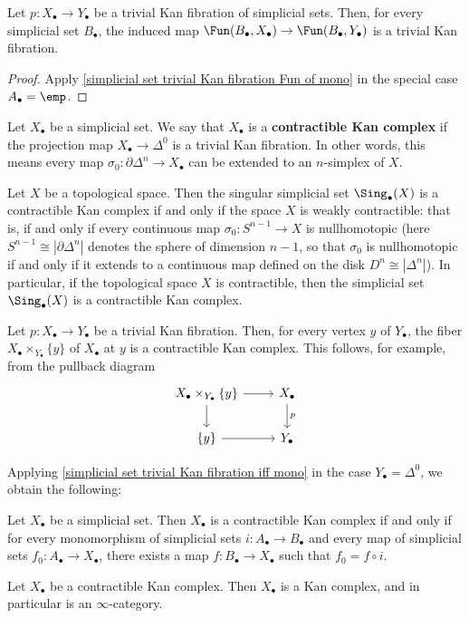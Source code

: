 \begin{corollary}\label{simplicial set Fun(B -) of trivial Kan fibration is fibration}
Let $p:X_\bullet\to Y_\bullet$ be a trivial Kan fibration of simplicial sets. Then, for every simplicial set $B_\bullet$, the induced map $\Fun(B_\bullet,X_\bullet)\to\Fun(B_\bullet,Y_\bullet)$ is a trivial Kan fibration.
\end{corollary}
\begin{proof}
Apply \ref{simplicial set trivial Kan fibration Fun of mono} in the special case $A_\bullet=\emp$.
\end{proof}
Let $X_\bullet$ be a simplicial set. We say that $X_\bullet$ is a \textbf{contractible Kan complex} if the projection map $X_\bullet\to\Delta^0$ is a trivial Kan fibration. In other words, this means every map $\sigma_0:\partial\Delta^n\to X_\bullet$ can be extended to an $n$-simplex of $X$.
\begin{example}
Let $X$ be a topological space. Then the singular simplicial set  $\Sing_\bullet(X)$ is a contractible Kan complex if and only if the space $X$ is weakly contractible: that is, if and only if every continuous map $\sigma_0:S^{n-1}\to X$ is nullhomotopic (here $S^{n-1}\cong|\partial\Delta^n|$ denotes the sphere of dimension $n-1$, so that $\sigma_0$ is nullhomotopic if and only if it extends to a continuous map defined on the disk $D^n\cong|\Delta^n|$). In particular, if the topological space $X$ is contractible, then the simplicial set $\Sing_\bullet(X)$ is a contractible Kan complex.
\end{example}
\begin{remark}\label{simplicial set trivial Kan fibarion fiberwise contractible}
Let $p:X_\bullet\to Y_\bullet$ be a trivial Kan fibration. Then, for every vertex $y$ of $Y_\bullet$, the fiber $X_\bullet\times_{Y_\bullet}\{y\}$ of $X_\bullet$ at $y$ is a contractible Kan complex. This follows, for example, from the pullback diagram
\[\begin{tikzcd}
X_\bullet\times_{Y_\bullet}\{y\}\ar[d]\ar[r]&X_\bullet\ar[d,"p"]\\
\{y\}\ar[r]&Y_\bullet
\end{tikzcd}\]
\end{remark}
Applying \cref{simplicial set trivial Kan fibration iff mono} in the case $Y_\bullet=\Delta^0$, we obtain the following:
\begin{corollary}\label{simplicial set contractible Kan iff extension of mono}
Let $X_\bullet$ be a simplicial set. Then $X_\bullet$ is a contractible Kan complex if and only if for every monomorphism of simplicial sets $i:A_\bullet\to B_\bullet$ and every map of simplicial sets $f_0:A_\bullet\to X_\bullet$, there exists a map $f:B_\bullet\to X_\bullet$ such that $f_0=f\circ i$.
\end{corollary}
\begin{corollary}
Let $X_\bullet$ be a contractible Kan complex. Then $X_\bullet$ is a Kan complex, and in particular is an $\infty$-category.
\end{corollary}
